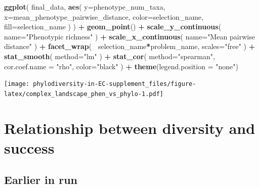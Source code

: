 \documentclass[]{book}
\newenvironment{Shaded}{\begin{snugshade}}{\end{snugshade}}
\newcommand{\DataTypeTok}[1]{\textcolor[rgb]{0.13,0.29,0.53}{#1}}
\newcommand{\KeywordTok}[1]{\textcolor[rgb]{0.13,0.29,0.53}{\textbf{#1}}}
\newcommand{\NormalTok}[1]{#1}
\newcommand{\OperatorTok}[1]{\textcolor[rgb]{0.81,0.36,0.00}{\textbf{#1}}}
\newcommand{\StringTok}[1]{\textcolor[rgb]{0.31,0.60,0.02}{#1}}
\begin{document}
\begin{Shaded}
\begin{Highlighting}[]
\KeywordTok{ggplot}\NormalTok{(}
\NormalTok{    final_data,}
    \KeywordTok{aes}\NormalTok{(}
        \DataTypeTok{y=}\NormalTok{phenotype_num_taxa,}
        \DataTypeTok{x=}\NormalTok{mean_phenotype_pairwise_distance,}
        \DataTypeTok{color=}\NormalTok{selection_name,}
        \DataTypeTok{fill=}\NormalTok{selection_name}
\NormalTok{    )}
\NormalTok{  ) }\OperatorTok{+}
\StringTok{  }\KeywordTok{geom_point}\NormalTok{() }\OperatorTok{+}
\StringTok{    }\KeywordTok{scale_y_continuous}\NormalTok{(}
        \DataTypeTok{name=}\StringTok{"Phenotypic richness"}
\NormalTok{  ) }\OperatorTok{+}
\StringTok{  }\KeywordTok{scale_x_continuous}\NormalTok{(}
        \DataTypeTok{name=}\StringTok{"Mean pairwise distance"}
\NormalTok{  ) }\OperatorTok{+}\StringTok{ }
\StringTok{  }\KeywordTok{facet_wrap}\NormalTok{(}
      \OperatorTok{~}\NormalTok{selection_name}\OperatorTok{*}\NormalTok{problem_name, }\DataTypeTok{scales=}\StringTok{"free"}
\NormalTok{  ) }\OperatorTok{+}\StringTok{ }
\StringTok{  }\KeywordTok{stat_smooth}\NormalTok{(}
    \DataTypeTok{method=}\StringTok{"lm"}
\NormalTok{  ) }\OperatorTok{+}\StringTok{ }
\StringTok{  }\KeywordTok{stat_cor}\NormalTok{(}
    \DataTypeTok{method=}\StringTok{"spearman"}\NormalTok{, }\DataTypeTok{cor.coef.name =} \StringTok{"rho"}\NormalTok{, }\DataTypeTok{color=}\StringTok{"black"}
\NormalTok{  ) }\OperatorTok{+}
\StringTok{  }\KeywordTok{theme}\NormalTok{(}\DataTypeTok{legend.position =} \StringTok{"none"}\NormalTok{)}
\end{Highlighting}
\end{Shaded}

\texttt{[image: phylodiversity-in-EC-supplement\_files/figure-latex/complex\_landscape\_phen\_vs\_phylo-1.pdf]}

\hypertarget{relationship-between-diversity-and-success-1}{%
\section{Relationship between diversity and success}\label{relationship-between-diversity-and-success-1}}

\hypertarget{earlier-in-run}{%
\subsection{Earlier in run}\label{earlier-in-run}}
\end{document}
